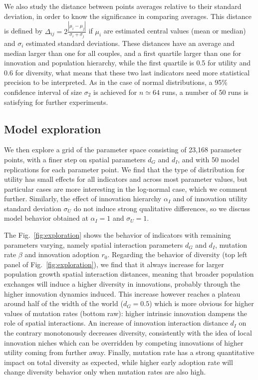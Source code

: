 \documentclass[letterpaper]{article}
\begin{document}
We also study the distance between points averages relative to their standard deviation, in order to know the significance in comparing averages. This distance is defined by $\Delta_{ij} = 2\frac{\left|\mu_i - \mu_j \right|}{\sigma_i + \sigma_j}$ if $\mu_i$ are estimated central values (mean or median) and $\sigma_i$ estimated standard deviations. These distances have an average and median larger than one for all couples, and a first quartile larger than one for innovation and population hierarchy, while the first quartile is 0.5 for utility and 0.6 for diversity, what means that these two last indicators need more statistical precision to be interpreted. As in the case of normal distributions, a 95\% confidence interval of size $\sigma_2$ is achieved for $n\simeq 64$ runs, a number of 50 runs is satisfying for further experiments.


\subsection{Model exploration}

We then explore a grid of the parameter space consisting of 23,168 parameter points, with a finer step on spatial parameters $d_G$ and $d_I$, and with 50 model replications for each parameter point. We find that the type of distribution for utility has small effects for all indicators and across most parameter values, but particular cases are more interesting in the log-normal case, which we comment further. Similarly, the effect of innovation hierarchy $\alpha_I$ and of innovation utility standard deviation $\sigma_U$ do not induce strong qualitative differences, so we discuss model behavior obtained at $\alpha_I = 1$ and $\sigma_U = 1$.

The Fig.~\ref{fig:exploration} shows the behavior of indicators with remaining parameters varying, namely spatial interaction parameters $d_G$ and $d_I$, mutation rate $\beta$ and innovation adoption $r_0$. Regarding the behavior of diversity (top left panel of Fig.~\ref{fig:exploration}), we find that it always increase for larger population growth spatial interaction distances, meaning that broader population exchanges will induce a higher diversity in innovations, probably through the higher innovation dynamics induced. This increase however reaches a plateau around half of the width of the world ($d_G = 0.5$) which is more obvious for higher values of mutation rates (bottom raw): higher intrinsic innovation dampens the role of spatial interactions. An increase of innovation interaction distance $d_I$ on the contrary monotonously decreases diversity, consistently with the idea of local innovation niches which can be overridden by competing innovations of higher utility coming from further away. Finally, mutation rate has a strong quantitative impact on total diversity as expected, while higher early adoption rate will change diversity behavior only when mutation rates are also high.
\end{document}
